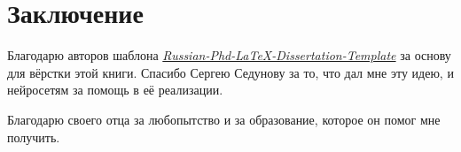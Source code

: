 \chapter*{Заключение}                       %

Благодарю авторов шаблона
\href{https://github.com/AndreyAkinshin/Russian-Phd-LaTeX-Dissertation-Template}{\textit{Russian-Phd-LaTeX-Dissertation-Template}}
за основу для вёрстки этой книги. Спасибо Сергею Седунову за то, что дал мне
эту идею, и нейросетям за помощь в её реализации.

Благодарю своего отца за любопытство и за образование, которое он помог мне получить.
